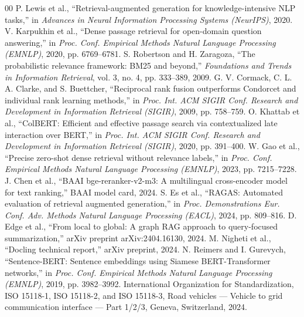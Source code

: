 \documentclass[conference]{IEEEtran}
\begin{document}
\begin{thebibliography}{00}
 P. Lewis et al., ``Retrieval-augmented generation for knowledge-intensive NLP tasks,'' in \emph{Advances in Neural Information Processing Systems (NeurIPS)}, 2020.
 V. Karpukhin et al., ``Dense passage retrieval for open-domain question answering,'' in \emph{Proc. Conf. Empirical Methods Natural Language Processing (EMNLP)}, 2020, pp. 6769--6781.
 S. Robertson and H. Zaragoza, ``The probabilistic relevance framework: BM25 and beyond,'' \emph{Foundations and Trends in Information Retrieval}, vol. 3, no. 4, pp. 333--389, 2009.
 G. V. Cormack, C. L. A. Clarke, and S. Buettcher, ``Reciprocal rank fusion outperforms Condorcet and individual rank learning methods,'' in \emph{Proc. Int. ACM SIGIR Conf. Research and Development in Information Retrieval (SIGIR)}, 2009, pp. 758--759.
 O. Khattab et al., ``ColBERT: Efficient and effective passage search via contextualized late interaction over BERT,'' in \emph{Proc. Int. ACM SIGIR Conf. Research and Development in Information Retrieval (SIGIR)}, 2020, pp. 391--400.
 W. Gao et al., ``Precise zero-shot dense retrieval without relevance labels,'' in \emph{Proc. Conf. Empirical Methods Natural Language Processing (EMNLP)}, 2023, pp. 7215--7228.
 J. Chen et al., ``BAAI bge-reranker-v2-m3: A multilingual cross-encoder model for text ranking,'' BAAI model card, 2024.
 S. Es et al., ``RAGAS: Automated evaluation of retrieval augmented generation,'' in \emph{Proc. Demonstrations Eur. Conf. Adv. Methods Natural Language Processing (EACL)}, 2024, pp. 809--816.
 D. Edge et al., ``From local to global: A graph RAG approach to query-focused summarization,'' arXiv preprint arXiv:2404.16130, 2024.
 M. Nigheti et al., ``Docling technical report,'' arXiv preprint, 2024.
 N. Reimers and I. Gurevych, ``Sentence-BERT: Sentence embeddings using Siamese BERT-Transformer networks,'' in \emph{Proc. Conf. Empirical Methods Natural Language Processing (EMNLP)}, 2019, pp. 3982--3992.
 International Organization for Standardization, ISO 15118-1, ISO 15118-2, and ISO 15118-3, Road vehicles --- Vehicle to grid communication interface --- Part 1/2/3, Geneva, Switzerland, 2024.
\end{thebibliography}
\end{document}
